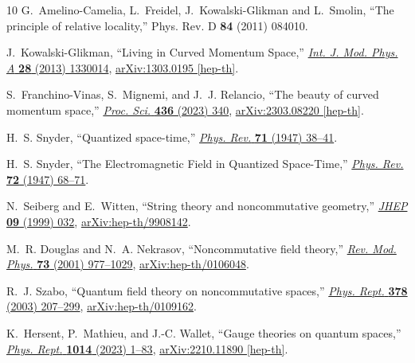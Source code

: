 \documentclass[12pt,a4paper]{article}
\numberwithin{equation}{section}
\theoremstyle{theorem}
\theoremstyle{remark}
\begin{document}
\begin{thebibliography}{10}
G.~Amelino-Camelia, L.~Freidel, J.~Kowalski-Glikman and L.~Smolin,
``The principle of relative locality,''
Phys. Rev. D \textbf{84} (2011) 084010.


J.~Kowalski-Glikman, ``{Living in Curved Momentum Space},'' \href{http://dx.doi.org/10.1142/S0217751X13300147}{{\em Int. J. Mod. Phys. A} {\bfseries 28} (2013) 1330014}, \href{http://arxiv.org/abs/1303.0195}{{\ttfamily arXiv:1303.0195 [hep-th]}}.

S.~Franchino-Vinas, S.~Mignemi, and J.~J. Relancio, ``{The beauty of curved momentum space},'' \href{http://dx.doi.org/10.22323/1.436.0340}{{\em Proc. Sci.} {\bfseries 436} (2023) 340}, \href{http://arxiv.org/abs/2303.08220}{{\ttfamily arXiv:2303.08220 [hep-th]}}.

H.~S. Snyder, ``{Quantized space-time},'' \href{http://dx.doi.org/10.1103/PhysRev.71.38}{{\em Phys. Rev.} {\bfseries 71} (1947) 38--41}.

H.~S. Snyder, ``{The Electromagnetic Field in Quantized Space-Time},'' \href{http://dx.doi.org/10.1103/PhysRev.72.68}{{\em Phys. Rev.} {\bfseries 72} (1947) 68--71}.

N.~Seiberg and E.~Witten, ``{String theory and noncommutative geometry},'' \href{http://dx.doi.org/10.1088/1126-6708/1999/09/032}{{\em JHEP} {\bfseries 09} (1999) 032}, \href{http://arxiv.org/abs/hep-th/9908142}{{\ttfamily arXiv:hep-th/9908142}}.

M.~R. Douglas and N.~A. Nekrasov, ``{Noncommutative field theory},'' \href{http://dx.doi.org/10.1103/RevModPhys.73.977}{{\em Rev. Mod. Phys.} {\bfseries 73} (2001) 977--1029}, \href{http://arxiv.org/abs/hep-th/0106048}{{\ttfamily arXiv:hep-th/0106048}}.

R.~J. Szabo, ``{Quantum field theory on noncommutative spaces},'' \href{http://dx.doi.org/10.1016/S0370-1573(03)00059-0}{{\em Phys. Rept.} {\bfseries 378} (2003) 207--299}, \href{http://arxiv.org/abs/hep-th/0109162}{{\ttfamily arXiv:hep-th/0109162}}.

K.~Hersent, P.~Mathieu, and J.-C. Wallet, ``{Gauge theories on quantum spaces},'' \href{http://dx.doi.org/10.1016/j.physrep.2023.03.002}{{\em Phys. Rept.} {\bfseries 1014} (2023) 1--83}, \href{http://arxiv.org/abs/2210.11890}{{\ttfamily arXiv:2210.11890 [hep-th]}}.


\end{thebibliography}
\end{document}
